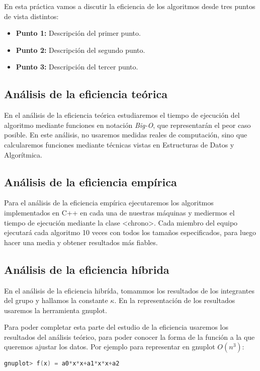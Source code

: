 \documentclass[a4paper,12pt]{article} %
\begin{document}
    En esta práctica vamos a discutir la eficiencia de los algoritmos
    desde tres puntos de vista distintos:

    \begin{itemize}
        \item \textbf{Punto 1:} Descripción del primer punto.
        \item \textbf{Punto 2:} Descripción del segundo punto.
        \item \textbf{Punto 3:} Descripción del tercer punto.
    \end{itemize}

    \subsection{Análisis de la eficiencia teórica}
    En el análisis de la eficiencia teórica estudiaremos el tiempo de ejecución del algoritmo
    mediante funciones en notación \textit{Big-O}, que representarán el peor caso posible.
    En este análisis, no usaremos medidas reales de computación, sino que calcularemos funciones 
    mediante técnicas vistas en Estructuras de Datos y Algorítmica.
    \subsection{Análisis de la eficiencia empírica}
    Para el análisis de la eficiencia empírica ejecutaremos los algoritmos implementados en C++ en cada 
    una de nuestras máquinas y mediermos el tiempo de ejecución mediante la 
    clase <chrono>. Cada miembro del equipo ejecutará cada algoritmo 10 veces con todos los tamaños especificados,
    para luego hacer una media y obtener resultados más fiables.
    \subsection{Análisis de la eficiencia híbrida}
    En el análisis de la eficiencia hibrída, tomammos los resultados de los integrantes del grupo y hallamos
    la constante $\kappa$. En la representación de los resultados usaremos la herramienta gnuplot.

    Para poder completar esta parte del estudio de la eficiencia usaremos los resultados del análisis teórico, para
    poder conocer la forma de la función a la que queremos ajustar los datos. Por ejemplo para representar en gnuplot $O(n^{3})$:

    \begin{lstlisting}[language=C, caption={Ejemplo de $O(n^{2})$}]
       gnuplot> f(x) = a0*x*x+a1*x*x+a2
        \end{lstlisting}
    
\end{document}
